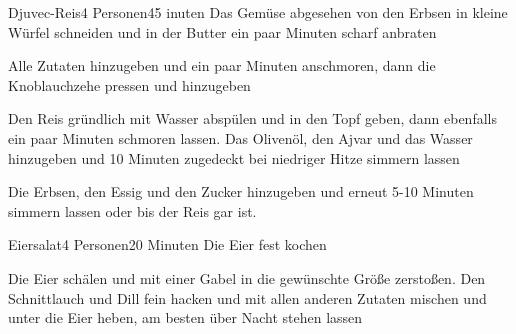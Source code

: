 
\begin{recipe}{Djuvec-Reis}{4 Personen}{45 inuten}
Das Gemüse abgesehen von den Erbsen in kleine Würfel schneiden und in der Butter ein paar Minuten scharf anbraten

Alle Zutaten hinzugeben und ein paar Minuten anschmoren, dann die Knoblauchzehe pressen und hinzugeben

Den Reis gründlich mit Wasser abspülen und in den Topf geben, dann ebenfalls ein paar Minuten schmoren lassen.
Das Olivenöl, den Ajvar und das Wasser hinzugeben und 10 Minuten zugedeckt bei niedriger Hitze simmern lassen

Die Erbsen, den Essig und den Zucker hinzugeben und erneut 5-10 Minuten simmern lassen oder bis der Reis gar ist.
\end{recipe}


\begin{recipe}{Eiersalat}{4 Personen}{20 Minuten}
Die Eier fest kochen

Die Eier schälen und mit einer Gabel in die gewünschte Größe zerstoßen. Den Schnittlauch und Dill fein hacken und mit allen anderen Zutaten mischen und unter die Eier heben, am besten über Nacht stehen lassen
\end{recipe}


